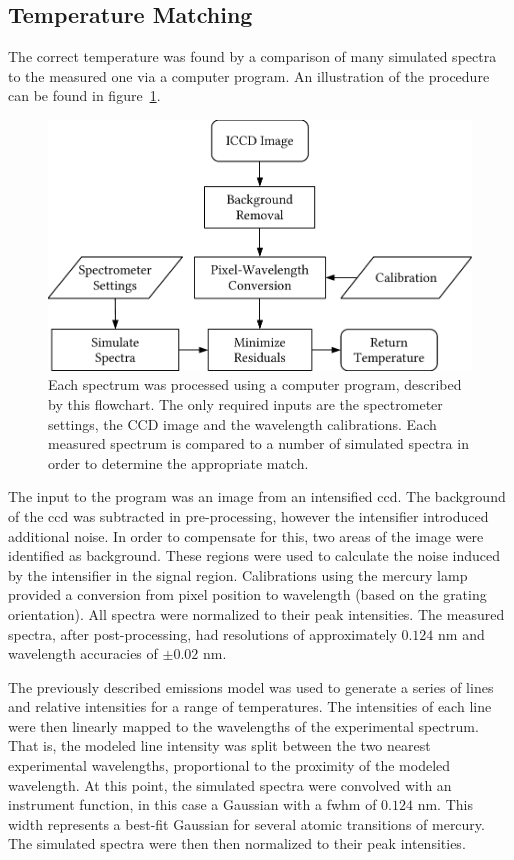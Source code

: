 \subsection{Temperature Matching}

The correct temperature was found by a comparison of many simulated spectra to
the measured one via a computer program. An illustration of the procedure can be
found in figure~\ref{fig:procedure}.
\begin{figure}
  \centering
  \includegraphics[scale=0.5]{./chapters/nasa/figures/procedure.pdf}
  \caption{Each spectrum was processed using a computer program, described by
    this flowchart. The only required inputs are the spectrometer settings, the CCD
    image and the wavelength calibrations. Each measured spectrum is compared to a
    number of simulated spectra in order to determine the appropriate match.}
  \label{fig:procedure}
\end{figure}

The input to the program was an image from an intensified \acs{ccd}. The
background of the \acs{ccd} was subtracted in pre-processing, however the
intensifier introduced additional noise. In order to compensate for this, two
areas of the image were identified as background. These regions were used to
calculate the noise induced by the intensifier in the signal region.
Calibrations using the mercury lamp provided a conversion from pixel position to
wavelength (based on the grating orientation). All spectra were normalized to
their peak intensities. The measured spectra, after post-processing, had
resolutions of approximately $0.124$ nm and wavelength accuracies of $\pm0.02$
nm.

The previously described emissions model was used to generate a series of lines
and relative intensities for a range of temperatures. The intensities of each
line were then linearly mapped to the wavelengths of the experimental spectrum.
That is, the modeled line intensity was split between the two nearest
experimental wavelengths, proportional to the proximity of the modeled
wavelength. At this point, the simulated spectra were convolved with an
instrument function, in this case a Gaussian with a \acs{fwhm} of $0.124$ nm.
This width represents a best-fit Gaussian for several atomic transitions of
mercury. The simulated spectra were then then normalized to their peak
intensities.

